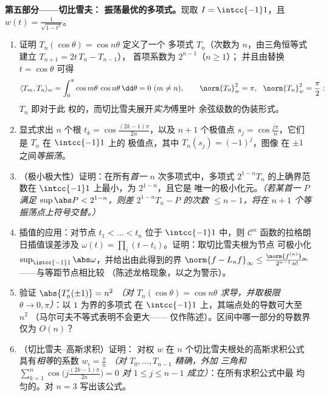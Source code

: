 \begin{problem}
\medskip
\noindent\textbf{第五部分——切比雪夫：
振荡最优的多项式。}现取 $I = \intcc{-1}1$，且 $w(t) =
\frac1{\sqrt{1 - t^2}}$。
\begin{enumerate}[resume]
  \item 证明 $T_n(\cos\theta) = \cos n\theta$ 定义了一个
        多项式 $T_n$（次数为 $n$，由三角恒等式建立 $T_{n+1} =
        2t\,T_n - T_{n-1}$），
        首项系数为 $2^{n-1}$（$n \geq 1$）；
        并且由替换 $t = \cos\theta$ 可得
        \[
        \langle T_m, T_n\rangle_w =
        \int_0^\pi\cos m\theta\,\cos n\theta\,\dd\theta
        = 0 \ (m \neq n), \qquad
        \norm{T_0}_w^2 = \pi,\ \ \norm{T_n}_w^2 = \frac\pi2 :
        \]
        $T_n$ 即对于此
        权的，而切比雪夫展开\emph{实为}傅里叶
        余弦级数的伪装形式。
  \item 显式求出 $n$ 个根 $t_k =
        \cos\frac{(2k-1)\pi}{2n}$，以及 $n + 1$ 个极值点
        $s_j = \cos\frac{j\pi}n$，它们是 $T_n$ 在 $\intcc{-1}1$ 上的
        极值点，其中 $T_n(s_j) = (-1)^j$，图像
        在 $\pm1$ 之间\emph{等振荡}。
  \item （极小极大性）证明：在所有\emph{首一}
        $n$ 次多项式中，多项式
        $2^{1-n}T_n$ 的上确界范数在
        $\intcc{-1}1$ 上最小，为 $2^{1-n}$，且它是
        唯一的极小化元。\emph{（若某首一 $P$ 满足
        $\sup\abs P < 2^{1-n}$，则差 $2^{1-n}T_n -
        P$ 的次数 $\leq n-1$，将在
        $n+1$ 个等振荡点上符号交替。）}
  \item 插值的应用：对节点 $t_1 < \dots
        < t_n$ 位于 $\intcc{-1}1$ 中，则
        $\mathcal C^n$ 函数的拉格朗日插值误差涉及
        $\omega(t) = \prod_i(t - t_i)$。证明：取切比雪夫根为节点
        可极小化
        $\sup_{\intcc{-1}1}\abs\omega$，并给出由此得到的界
        $\norm{f -
        L_nf}_\infty \leq \frac{\norm{f^{(n)}}_\infty}
        {2^{n-1}\,n!}$——与等距节点相比较
        （陈述龙格现象，以之为警示）。
  \item 验证 $\abs{T_n'(\pm1)} = n^2$ \emph{（对
        $T_n(\cos\theta) = \cos n\theta$ 求导，并取极限
        $\theta \to 0, \pi$）}：以 $1$ 为界的多项式
        在 $\intcc{-1}1$ 上，其端点处的导数可大至 $n^2$
        （马尔可夫不等式表明不会更大——
        仅作陈述）。区间中哪一部分的导数界
        仅为 $O(n)$？
  \item （切比雪夫--高斯求积）证明：
        对权 $w$ 在 $n$ 个切比雪夫根处的高斯求积公式
        具有\emph{相等}的系数 $w_i = \frac\pi n$
        \emph{（对 $T_0, \dots, T_{n-1}$ 精确，外加
        三角和
        $\sum_{k=1}^n\cos\bigl(j\tfrac{(2k-1)\pi}{2n}\bigr) =
        0$ 对 $1 \leq j \leq n - 1$ 成立）}：在所有求积公式中最
        均匀的。对 $n = 3$ 写出该公式。
\end{enumerate}


\end{problem}
